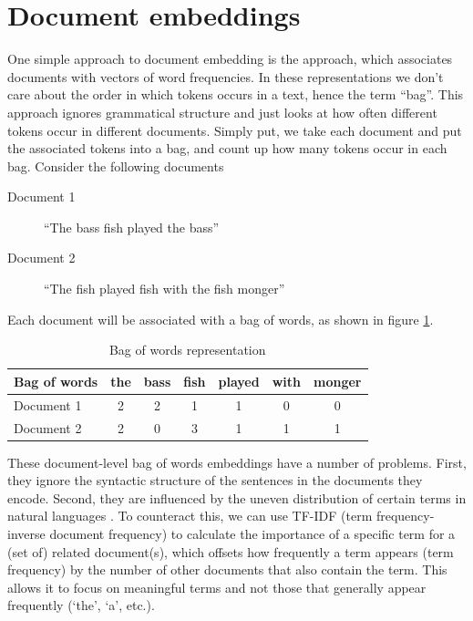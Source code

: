 

\section{Document embeddings}

One simple approach to document embedding is the  approach, which associates documents with vectors of word frequencies. In these representations we don't care about the order in which tokens occurs in a text, hence the term ``bag''. This approach ignores grammatical structure and just looks at how often different tokens occur in different documents.  Simply put, we take each document and put the associated tokens into a bag, and count up how many tokens occur in each bag. Consider the following documents

\begin{description}
\item[Document 1]  ``The bass fish played the bass''
\item[Document 2]  ``The fish played fish with the fish monger''
\end{description}

Each document will be associated with a bag of words, as shown in figure \ref{exampleBags}.

\begin{table}[h]
    \centering
    \begin{tabular}{|l|c|c|c|c|c|c|}
    \hline
    Bag of words & the & bass & fish & played & with & monger \\
    \hline
    Document 1 & 2 & 2 & 1 & 1 & 0 & 0 \\
    Document 2 & 2 & 0 & 3 & 1 & 1 & 1 \\
    \hline
    \end{tabular}
    \caption{Bag of words representation}
    \label{exampleBags}
\end{table}

These document-level bag of words embeddings have a number of problems. First, they ignore the syntactic structure of the sentences in the documents they encode.  Second, they are influenced by the uneven distribution of certain terms in natural languages \cite{piantadosi2014zipf, zipf1945meaning}. To counteract this, we can use TF-IDF (term frequency-inverse document frequency) to calculate the importance of a specific term for a (set of) related document(s), which offsets how frequently a term appears (term frequency) by the number of other documents that also contain the term. This allows it to focus on meaningful terms and not those that generally appear frequently (`the', `a', etc.). 

